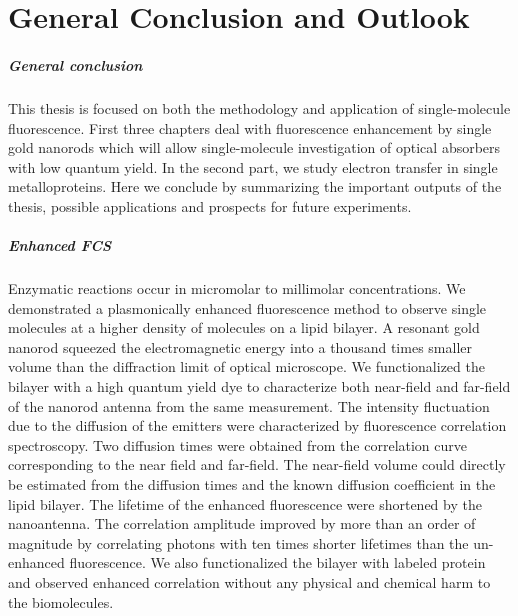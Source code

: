 \chapter*{General Conclusion and Outlook}
\label{ch:conclusion}

\paragraph*{General conclusion}
This thesis is focused on both the methodology and application of single-molecule fluorescence. First three chapters deal with fluorescence enhancement by single gold nanorods which will allow single-molecule investigation of optical absorbers with low quantum yield. In the second part, we study electron transfer in single metalloproteins. Here we conclude by summarizing the important outputs of the thesis, possible applications and prospects for future experiments.

\paragraph*{Enhanced FCS}
Enzymatic reactions occur in micromolar to millimolar concentrations. We demonstrated a plasmonically enhanced fluorescence method to observe single molecules at a higher density of molecules on a lipid bilayer. A resonant gold nanorod squeezed the electromagnetic energy into a thousand times smaller volume than the diffraction limit of optical microscope. We functionalized the bilayer with a high quantum yield dye to characterize both near-field and far-field of the nanorod antenna from the same measurement. The intensity fluctuation due to the diffusion of the emitters were characterized by fluorescence correlation spectroscopy. Two diffusion times were obtained from the correlation curve corresponding to the near field and far-field. The near-field volume could directly be estimated from the diffusion times and the known diffusion coefficient in the lipid bilayer. The lifetime of the enhanced fluorescence were shortened by the nanoantenna. The correlation amplitude improved by more than an order of magnitude by correlating photons with ten times shorter lifetimes than the un-enhanced fluorescence. We also functionalized the bilayer with labeled protein and observed enhanced correlation without any physical and chemical harm to the biomolecules.

